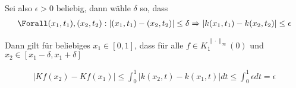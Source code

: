\begin{solution}
\begin{enumerate}
Sei also $\epsilon > 0$ beliebig, dann wähle $\delta$ so, dass
\begin{align*}
  \Forall (x_1,t_1),(x_2,t_2): | (x_1,t_1) - (x_2,t_2)| \leq \delta \Rightarrow | k(x_1,t_1) - k(x_2,t_2)| \leq \epsilon
\end{align*}

Dann gilt für beliebiges $x_1 \in [0,1]$, dass für alle $f \in K_{1}^{\|\cdot\|_{\infty}}(0)$ und $x_2 \in [x_1-\delta,x_1+\delta]$

\begin{align*}
  |Kf(x_2) - Kf(x_1)| \leq \int_{0}^{1} |k(x_2,t)- k(x_1,t)|dt \leq \int_{0}^{1} \epsilon dt = \epsilon
\end{align*}

 \end{enumerate}


\end{solution}
